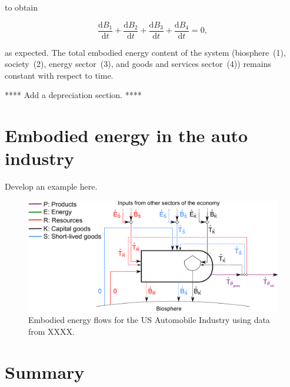 \noindent to obtain

\begin{equation} \label{eq:C-B_sums_to_zero}
	\frac{\mathrm{d}B_{1}}{\mathrm{d}t} 
	+ \frac{\mathrm{d}B_{2}}{\mathrm{d}t} 
	+ \frac{\mathrm{d}B_{3}}{\mathrm{d}t} 
	+ \frac{\mathrm{d}B_{4}}{\mathrm{d}t} 
	= 0,
\end{equation}

\noindent as expected. The total embodied energy content of the system 
(biosphere~(1), society~(2), energy sector~(3), 
and goods and services sector~(4)) 
remains constant with respect to time.

**** Add a depreciation section. ****


\section{Embodied energy in the auto industry}
\label{sec:embodied_energy_auto}

Develop an example here.

\begin{figure}[h!]
\centering
\includegraphics[width=0.8\linewidth]{Part_2/Chapter_Embodied/images/PERKS_basic_unit_embodied_energy_content_auto_ind.pdf}
\caption{Embodied energy flows for the US Automobile Industry using data from XXXX.}
\label{fig:PERKS_energy_auto}
\end{figure}

\section{Summary}
\label{sec:embodied_energy_summary}







